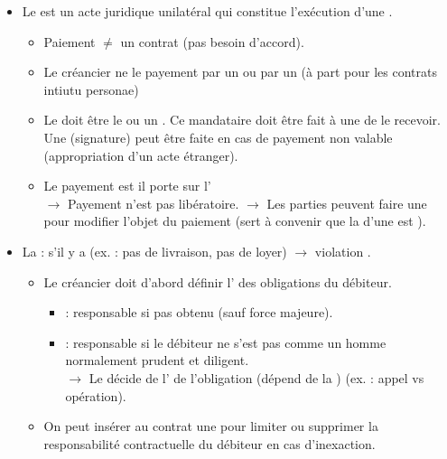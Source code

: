 \begin{itemize}
	\item Le  est un acte juridique unilatéral qui constitue l'exécution d'une .
	\begin{itemize}
		\item Paiement $\neq$ un contrat (pas besoin d'accord).
		\item Le créancier ne  le payement par un  ou par un  (à part pour les contrats intiutu personae)
		\item Le  doit être le  ou un . Ce mandataire doit être fait à une  de le recevoir. Une  (signature) peut être faite en cas de payement non valable (appropriation d'un acte étranger).
		\item Le payement est  il porte sur l'\\
		$\rightarrow$ Payement  n'est pas libératoire.
		$\rightarrow$ Les parties peuvent faire une  pour modifier l'objet du paiement (sert à convenir que la  d'une  est ).
	\end{itemize}
	\item La  : s'il y a  (ex. : pas de livraison, pas de loyer) $\rightarrow$ violation .
	\begin{itemize}
		\item Le créancier doit d'abord définir l' des obligations du débiteur.
		\begin{itemize}
			\item {} : responsable si  pas obtenu (sauf force majeure).
			\item {} : responsable si le débiteur ne s'est pas  comme un homme normalement prudent et diligent.\\
			$\rightarrow$ Le  décide de l' de l'obligation (dépend de la ) (ex. : appel vs opération).
		\end{itemize}
		\item On peut insérer au contrat une  pour limiter ou supprimer la responsabilité contractuelle du débiteur en cas d'inexaction.

\end{itemize}
\end{itemize}
